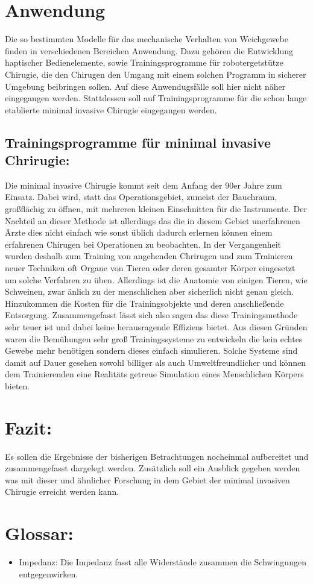 \documentclass[11pt]{article}
\begin{document}
	\section{Anwendung}
		Die so bestimmten Modelle für das mechanische Verhalten von Weichgewebe finden in 
		verschiedenen Bereichen Anwendung. Dazu gehören die Entwicklung haptischer Bedienelemente, 
		sowie Trainingsprogramme für robotergetstütze Chirugie, die den 
		Chirugen den Umgang mit einem solchen Programm in sicherer Umgebung beibringen sollen.
		Auf diese Anwendugsfälle soll hier nicht näher eingegangen werden. Stattdessen
		soll auf Trainingsprogramme für die schon lange etablierte minimal invasive Chirugie 
		eingegangen werden.
		 
		\subsection{Trainingsprogramme für minimal invasive Chrirugie:}
			Die minimal invasive Chirugie kommt seit dem Anfang der 90er Jahre zum Einsatz. Dabei
			wird, statt das Operationsgebiet, zumeist der Bauchraum, großflächig zu öffnen, mit 
			mehreren kleinen Einschnitten für die Instrumente. Der Nachteil an dieser Methode ist 
			allerdings das die in diesem Gebiet unerfahrenen Ärzte dies nicht einfach wie sonst
			üblich dadurch erlernen können einem erfahrenen Chirugen bei Operationen zu beobachten.
			In der Vergangenheit wurden deshalb zum Training von angehenden Chrirugen 
			und zum Trainieren neuer Techniken oft Organe von Tieren oder deren gesamter Körper 
			eingesetzt um solche Verfahren zu üben. Allerdings ist die Anatomie von einigen 
			Tieren, wie Schweinen, zwar änlich zu der menschlichen aber sicherlich nicht genau 
			gleich. Hinzukommen die Kosten für die Trainingsobjekte und deren anschließende 
			Entsorgung. Zusammengefasst lässt sich also sagen das diese Trainingsmethode sehr 
			teuer ist und dabei keine herausragende Effiziens bietet. 
			Aus diesen Gründen waren die Bemühungen sehr groß Trainingssysteme zu entwickeln die 
			kein echtes Gewebe mehr benötigen sondern dieses einfach simulieren. Solche Systeme 
			sind damit auf Dauer gesehen sowohl billiger als auch Umweltfreundlicher und können
			dem Trainierenden eine Realitäts getreue Simulation eines Menschlichen Körpers bieten.
			  

			
	\section{Fazit:}
			Es sollen die Ergebnisse der bisherigen Betrachtungen nocheinmal aufbereitet und 
			zusammengefasst dargelegt werden. Zusätzlich soll ein Ausblick gegeben werden was 
			mit dieser und ähnlicher Forschung in dem Gebiet der minimal invasiven Chirugie erreicht
			werden kann.
			  
			
	\section{Glossar:}
	\begin{itemize}
		\item Impedanz: Die Impedanz fasst alle Widerstände zusammen die Schwingungen entgegenwirken.
	\end{itemize}
			 
		  
\end{document}

